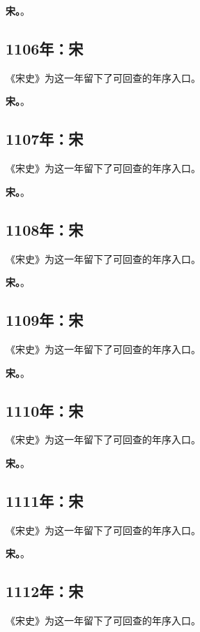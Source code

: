 \noindent\textbf{宋。}。

\subsection{1106年：宋}
《宋史》为这一年留下了可回查的年序入口。

\noindent\textbf{宋。}。

\subsection{1107年：宋}
《宋史》为这一年留下了可回查的年序入口。

\noindent\textbf{宋。}。

\subsection{1108年：宋}
《宋史》为这一年留下了可回查的年序入口。

\noindent\textbf{宋。}。

\subsection{1109年：宋}
《宋史》为这一年留下了可回查的年序入口。

\noindent\textbf{宋。}。

\subsection{1110年：宋}
《宋史》为这一年留下了可回查的年序入口。

\noindent\textbf{宋。}。

\subsection{1111年：宋}
《宋史》为这一年留下了可回查的年序入口。

\noindent\textbf{宋。}。

\subsection{1112年：宋}
《宋史》为这一年留下了可回查的年序入口。


